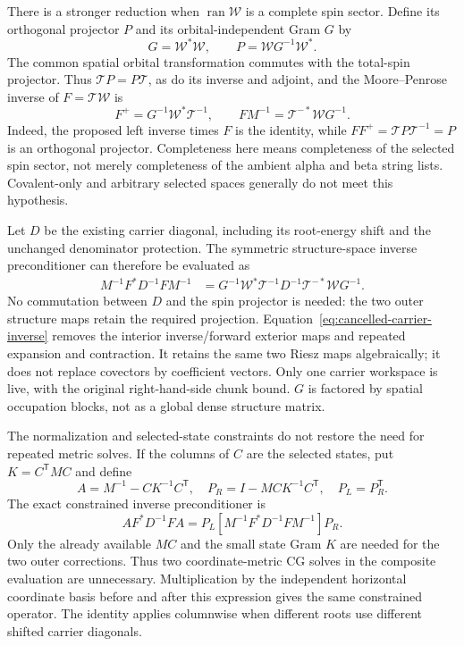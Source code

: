 \documentclass[11pt,a4paper]{article}
\DeclareMathOperator{\ran}{ran}
\newcommand{\Tr}{^{\mathsf T}}
\newcommand{\Wa}{\mathcal W}
\newcommand{\Ta}{\mathcal T}
\begin{document}
There is a stronger reduction when $\ran\Wa$ is a complete spin sector.
Define its orthogonal projector $P$ and its orbital-independent Gram $G$ by
\begin{equation}
 G=\Wa^*\Wa,\qquad P=\Wa G^{-1}\Wa^*.
\end{equation}
The common spatial orbital transformation commutes with the total-spin
projector. Thus $\Ta P=P\Ta$, as do its inverse and adjoint, and the
Moore--Penrose inverse of $F=\Ta\Wa$ is
\begin{equation}\label{eq:complete-left-inverse}
 F^+=G^{-1}\Wa^*\Ta^{-1},\qquad
 FM^{-1}=\Ta^{-*}\Wa G^{-1}.
\end{equation}
Indeed, the proposed left inverse times $F$ is the identity, while
$FF^+=\Ta P\Ta^{-1}=P$ is an orthogonal projector. Completeness here
means completeness of the selected spin sector, not merely completeness of
the ambient alpha and beta string lists. Covalent-only and arbitrary
selected spaces generally do not meet this hypothesis.

Let $D$ be the existing carrier diagonal, including its root-energy shift
and the unchanged denominator protection. The symmetric structure-space
inverse preconditioner can therefore be evaluated as
\begin{align}
 M^{-1}F^*D^{-1}FM^{-1}
 &=G^{-1}\Wa^*\Ta^{-1}D^{-1}\Ta^{-*}\Wa G^{-1}.
 \label{eq:cancelled-carrier-inverse}
\end{align}
No commutation between $D$ and the spin projector is needed: the two outer
structure maps retain the required projection. Equation~\eqref{eq:cancelled-carrier-inverse}
removes the interior inverse/forward exterior maps and repeated expansion
and contraction. It retains the same two Riesz maps algebraically; it does
not replace covectors by coefficient vectors. Only one carrier workspace
is live, with the original right-hand-side chunk bound. $G$ is factored by
spatial occupation blocks, not as a global dense structure matrix.

The normalization and selected-state constraints do not restore the need
for repeated metric solves. If the columns of $C$ are the selected states,
put $K=C\Tr MC$ and define
\begin{equation}
 A=M^{-1}-CK^{-1}C\Tr,\quad
 P_R=I-MCK^{-1}C\Tr,\quad P_L=P_R\Tr.
\end{equation}
The exact constrained inverse preconditioner is
\begin{equation}\label{eq:horizontal-carrier-inverse}
 A F^*D^{-1}F A
 =P_L\left[M^{-1}F^*D^{-1}FM^{-1}\right]P_R.
\end{equation}
Only the already available $MC$ and the small state Gram $K$ are needed
for the two outer corrections. Thus two coordinate-metric CG solves in
the composite evaluation are unnecessary. Multiplication by the independent
horizontal coordinate basis before and after this expression gives the
same constrained operator. The identity applies columnwise when different
roots use different shifted carrier diagonals.
\end{document}
